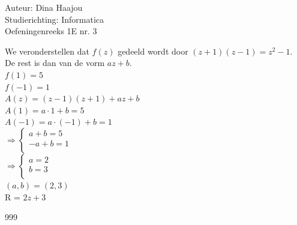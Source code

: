 \documentclass[a4paper]{article}
\begin{document}
\noindent \large Auteur: Dina Haajou \\
\noindent \large Studierichting: Informatica \\
\noindent \large Oefeningenreeks 1E nr. 3 \\

\normalsize

We veronderstellen dat $f(z)$ gedeeld wordt door $(z + 1)(z - 1) = z^2 - 1$. \\

De rest is dan van de vorm $az + b$. \\

$f(1) = 5$ \\

$f(-1) = 1$ \\

$A(z) = (z - 1)(z + 1) + az + b$ \\

$A(1) = a \cdot 1 + b = 5$ \\

$A(-1) = a \cdot (-1) + b = 1$ \\

$\Rightarrow \left\{
   \begin{array}{l}
     a + b = 5 \\
     -a + b = 1 \\
   \end{array}
\right.$ \\

$\Rightarrow \left\{
   \begin{array}{l}
     a = 2 \\
     b = 3 \\
   \end{array}
\right.$ \\

$(a, b) = (2, 3)$ \\

R = $2z + 3$

\begin{thebibliography}{999}
\end{thebibliography}
\end{document}
